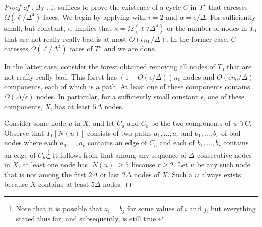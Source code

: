 \documentclass{patmorin}
\newcommand{\dual}[1]{{#1}^\star}
\begin{document}
\begin{proof}[Proof of ]
By , it suffices to prove the existence of
a cycle $C$ in $\dual{T}$ that caresses $\Omega(\ell/\Delta^4)$
faces.  We begin by applying  with
$i=2$ and $\alpha = \epsilon/\Delta$.  For sufficiently small, but constant,
$\epsilon$,  implies that $\kappa =
\Omega(\ell/\Delta^4)$ or the number of nodes in $T_0$ that are not really
really bad is at most $O(\epsilon n_0/\Delta)$.  In the former case,
$C$ caresses $\Omega(\ell/\Delta^4)$ faces of $\dual{T}$ and we are done.

In the latter case, consider the forest obtained removing
all nodes of $T_0$ that are not really really bad.  This forest has
$(1-O(\epsilon/\Delta))n_0$ nodes and $O(\epsilon n_0/\Delta)$ components,
each of which is a path.  At least one of these components contains
$\Omega(\Delta/\epsilon)$ nodes. In particular, for a sufficiently
small constant $\epsilon$, one of these components, $X$, has at least
$5\Delta$ nodes.


Consider some node $u$ in $X$, and let $C_a$ and $C_b$ be the
two components of $u\cap C$. Observe that $T_1[N(u)]$ consists
of two paths $a_1,\ldots,a_r$ and $b_1,\ldots,b_s$ of bad nodes
where each $a_1,\ldots,a_r$ contains an edge of $C_a$ and each of
$b_1,\ldots,b_r$ contains an edge of $C_b$.\footnote{Note that it is
possible that $a_i=b_j$ for some values of $i$ and $j$, but everything
stated thus far, and subsequently, is still true.} It follows from
 that among any sequence of $\Delta$
consecutive nodes in $X$, at least one node has $|N(u)|\ge 5$ because
$r\ge 2$.  Let $u$ be any such node that is not among the first $2\Delta$
or last $2\Delta$ nodes of $X$.  Such a $u$ always exists because $X$
contains at least $5\Delta$ nodes.


\end{proof}
\end{document}
